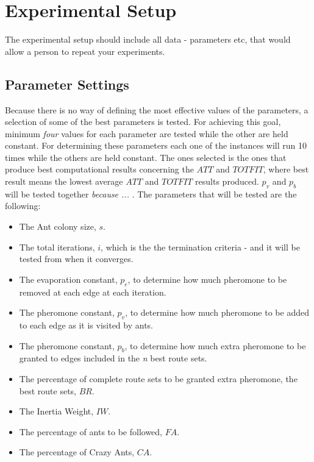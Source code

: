\section{Experimental Setup}

The experimental setup should include all data - parameters etc, that would allow a person to repeat your experiments. 
 
\subsection{Parameter Settings}
\label{subsec:parameterSettings_setup}

Because there is no way of defining the most effective values of the parameters, a selection of some of the best parameters is tested. For achieving this goal, minimum \textit{four} values for each parameter are tested while the other are held constant. For determining these parameters each one of the instances will run 10 times while the others are held constant. The ones selected is the ones that produce best computational results concerning the $ATT$ and $TOTFIT$, where best result means the lowest average $ATT$ and $TOTFIT$ results produced. $p_{v}$ and $p_{b}$ will be tested together \emph{\color{red}because ... }. The parameters that will be tested are the following:

\begin{itemize}
\item The Ant colony size, $s$.
\item The total iterations, $i$, which is the the termination criteria - and it will be tested from when it converges. 
\item The evaporation constant, $p_{e}$, to determine how much pheromone to be removed at each edge at each iteration. 
\item The pheromone constant, $p_{v}$, to determine how much pheromone to be added to each edge as it is visited by ants. 
\item The pheromone constant, $p_{b}$, to determine how much extra pheromone to be granted to edges included in the \textit{n} best route sets.
\item The percentage of complete route sets to be granted extra pheromone, the best route sets, $BR$.
\item The Inertia Weight, $IW$.
\item The percentage of ants to be followed, $FA$.
\item The percentage of Crazy Ants, $CA$.
\end{itemize}

